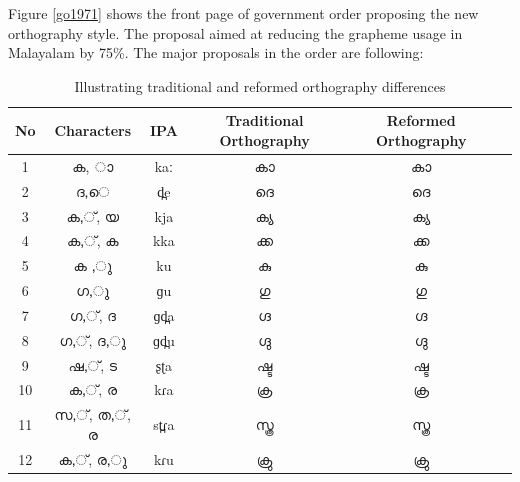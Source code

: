 \documentclass[10pt]{article}
\begin{document}
Figure \ref{go1971} shows the front page of government order proposing the new orthography style. The proposal aimed at reducing the grapheme usage in Malayalam by 75\%. The major proposals in the order are following: \cite{1971go}


\begin{table}
	\centering
	
	\begin{tabular}{|c|c|c|c|c|c}
		\hline
		No & Characters &IPA & Traditional  Orthography & Reformed Orthography \\ \hline \hline
		1 & {\manjari ക, ാ} &kaː& {\manjari കാ} & {\raghu കാ} \\
		\hline
		2 &  {\manjari ദ,െ} & d̪e & {\manjari ദെ} & {\raghu ദെ}  \\
		\hline
		3 & {\manjari ക,്, യ} &kja  &{\manjari ക്യ} & {\raghu ക്യ} \\
		\hline
		4 & {\manjari ക,്, ക} &kka &{\manjari ക്ക} & {\raghu ക്ക} \\
		\hline
		5 & {\manjari ക ,ു} & ku& {\manjari കു} & {\raghu കു} \\
		\hline
		6 & {\manjari ഗ,ു} &  ɡu&{\manjari ഗു} & {\raghu ഗു} \\
		\hline
		7 & {\manjari ഗ,്, ദ} &ɡd̪a &{\manjari ഗ്ദ} & {\raghu ഗ്ദ} \\
		\hline
		8 & {\manjari ഗ,്, ദ,ു} &ɡd̪u& {\manjari ഗ്ദു} & {\raghu ഗ്ദു} \\
		\hline
		9 & {\manjari ഷ,്, ട} &ʂʈa& {\manjari ഷ്ട} & {\raghu ഷ്ട} \\	
		\hline
		10 & {\manjari ക,്, ര} &kɾa &{\manjari ക്ര} & {\raghu ക്ര} \\
		\hline
		11 & {\manjari സ,്, ത,്, ര} &st̪ɾa &{\manjari സ്ത്ര} & {\raghu സ്ത്ര} \\
		\hline
		12 & {\manjari ക,്, ര,ു} & kɾu&{\manjari ക്രു} & {\raghu ക്രു} \\
		\hline
		
	\end{tabular}
	\caption{Illustrating traditional and reformed orthography differences}
	\label{orthographycomparison}
\end{table}
\end{document}
